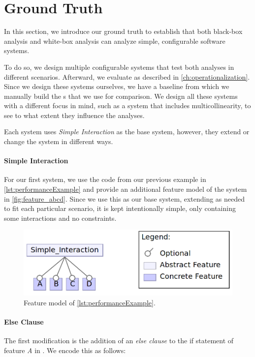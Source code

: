 \section{Ground Truth}\label{sec:ground-truth}
In this section, we introduce our ground truth to establish that both black-box analysis 
and white-box analysis can analyze simple, configurable software systems. 

To do so, we design multiple configurable systems that test both analyses in different scenarios. 
Afterward, we evaluate as described in \autoref{ch:operationalization}. 
Since we design these systems ourselves, we have a baseline from which we manually build the {\perfInfluenceModel}s that we use for comparison. 
We design all these systems with a different focus in mind, such as a system that includes multicollinearity, 
to see to what extent they influence the analyses. 

Each system uses \emph{Simple Interaction} as the base system, however, they extend or change the system in different ways.

\paragraph{Simple Interaction}\label{ground-truth:Simple}
For our first system, we use the code from our previous example in \autoref{lst:performanceExample} and provide an additional feature model 
of the system in \autoref{fig:feature_abcd}. 
Since we use this as our base system, extending as needed to fit each
particular scenario, it is kept intentionally simple, only containing some interactions and no constraints.

\begin{figure}[h]
    \centering
    \includegraphics[scale=0.25]{gfx/Feature_ABCD.png}
    \caption{Feature model of \autoref{lst:performanceExample}.}
    \label{fig:feature_abcd}
\end{figure}


\paragraph{Else Clause}
The first modification is the addition of an \emph{else clause} to the if statement of feature \emph{A} in . 
We encode this as follows:

